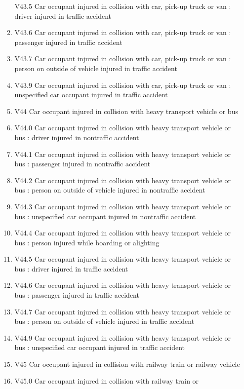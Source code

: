 \documentclass[
]{scrartcl}
\begin{document}
\begin{itemize}
\begin{enumerate}
    V43.5 Car occupant injured in collision with car, pick-up truck or
    van : driver injured in traffic accident
  \item
    V43.6 Car occupant injured in collision with car, pick-up truck or
    van : passenger injured in traffic accident
  \item
    V43.7 Car occupant injured in collision with car, pick-up truck or
    van : person on outside of vehicle injured in traffic accident
  \item
    V43.9 Car occupant injured in collision with car, pick-up truck or
    van : unspecified car occupant injured in traffic accident
  \item
    V44 Car occupant injured in collision with heavy transport vehicle
    or bus
  \item
    V44.0 Car occupant injured in collision with heavy transport vehicle
    or bus : driver injured in nontraffic accident
  \item
    V44.1 Car occupant injured in collision with heavy transport vehicle
    or bus : passenger injured in nontraffic accident
  \item
    V44.2 Car occupant injured in collision with heavy transport vehicle
    or bus : person on outside of vehicle injured in nontraffic accident
  \item
    V44.3 Car occupant injured in collision with heavy transport vehicle
    or bus : unspecified car occupant injured in nontraffic accident
  \item
    V44.4 Car occupant injured in collision with heavy transport vehicle
    or bus : person injured while boarding or alighting
  \item
    V44.5 Car occupant injured in collision with heavy transport vehicle
    or bus : driver injured in traffic accident
  \item
    V44.6 Car occupant injured in collision with heavy transport vehicle
    or bus : passenger injured in traffic accident
  \item
    V44.7 Car occupant injured in collision with heavy transport vehicle
    or bus : person on outside of vehicle injured in traffic accident
  \item
    V44.9 Car occupant injured in collision with heavy transport vehicle
    or bus : unspecified car occupant injured in traffic accident
  \item
    V45 Car occupant injured in collision with railway train or railway
    vehicle
  \item
    V45.0 Car occupant injured in collision with railway train or

\end{enumerate}
\end{itemize}
\end{document}
